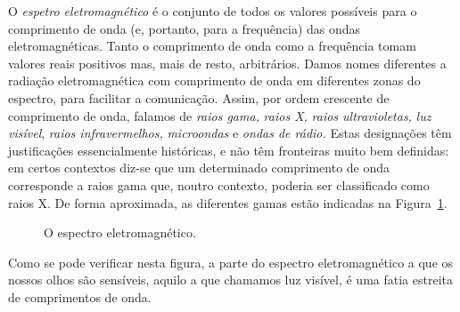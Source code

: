O \emph{espetro eletromagnético} é o conjunto de todos os valores possíveis para
o comprimento de onda (e, portanto, para a frequência) das ondas
eletromagnéticas. Tanto o comprimento de onda como a frequência tomam valores
reais positivos mas, mais de resto, arbitrários. Damos nomes diferentes a
radiação eletromagnética com comprimento de onda em diferentes zonas do
espectro, para facilitar a comunicação. Assim, por ordem crescente de
comprimento de onda, falamos de \emph{raios gama,} \emph{raios X,}
\emph{raios ultravioletas,} \emph{luz visível}, \emph{raios infravermelhos,}
\emph{microondas} e \emph{ondas de rádio.} Estas designações têm justificações
essencialmente históricas, e não têm fronteiras muito bem definidas: em certos
contextos diz-se que um determinado comprimento de onda corresponde a raios gama
que, noutro contexto, poderia ser classificado como raios X. De forma
aproximada, as diferentes gamas estão indicadas na Figura~\ref{fig:elmgspec}.
\begin{figure}[htb]
  {\centering
    \caption{O espectro eletromagnético.\label{fig:elmgspec}}\par
  }
\end{figure}
Como se pode verificar nesta figura, a parte do espectro eletromagnético a que
os nossos olhos são sensíveis, aquilo a que chamamos luz visível, é uma fatia
estreita de comprimentos de onda.

